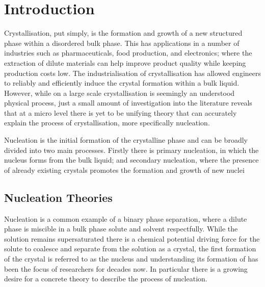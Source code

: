 \documentclass[a4paper,oneside,11pt]{book}
\begin{document}
\chapter{Introduction}
Crystallisation, put simply, is the formation and growth of a new structured phase within a disordered bulk phase. This has applications in a 
number of industries such as pharmaceuticals, food production, and 
electronics; where the extraction of dilute materials can help improve 
product quality while keeping production costs low. The industrialisation 
of crystallisation has allowed engineers to reliably and efficiently 
induce the crystal formation within a bulk liquid. However, while on a 
large scale crystallisation is seemingly an understood physical process, 
just a small amount of investigation into the literature reveals that at 
a micro level there is yet to be unifying theory that can accurately 
explain the process of crystallisation, more specifically nucleation.

Nucleation is the initial formation of the crystalline phase and can be 
broadly divided into two main processes. Firstly there is primary 
nucleation, in which the nucleus forms from the bulk liquid; and 
secondary nucleation, where the presence of already existing crystals 
promotes the formation and growth of new nuclei 

\section{Nucleation Theories}
Nucleation is a common example of a binary phase separation, where a dilute phase is miscible in a bulk phase solute and solvent respectfully. While the solution remains supersaturated there is a chemical potential driving force for the solute to coalesce and separate from the solution as a crystal, the first formation of the crystal is referred to as the nucleus and understanding its formation of has been the focus of researchers for decades now. In particular there is a growing desire for a concrete theory to describe the process of nucleation.
\end{document}

